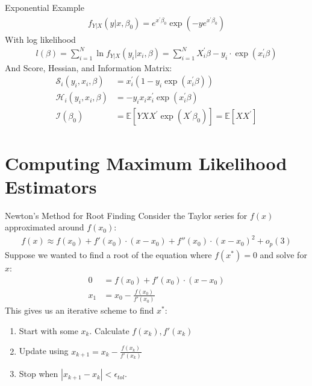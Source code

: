 \documentclass[aspectratio=169]{beamer}
\begin{document}
\begin{frame}{Exponential Example}
\begin{align*}
f _ { Y | X } ( y | x , \beta _ { 0 } ) =  { e } ^ { x ^ { \prime } \beta _ { 0 } } \exp \left( - y  { e } ^ { x ^ { \prime } \beta _ { 0 } } \right)
\end{align*}
With log likelihood
\begin{align*}
l( \beta ) = \sum _ { i = 1 } ^ { N } \ln f _ { Y | X } \left( y _ { i } | x _ { i } , \beta \right) = \sum _ { i = 1 } ^ { N } X _ { i } ^ { \prime } \beta - y _ { i } \cdot \exp \left( x _ { i } ^ { \prime } \beta \right)
\end{align*}
And Score, Hessian, and Information Matrix:
\begin{align*}
\mathcal { S }_i ( y_i, x_i , \beta ) &= x_i ^ { \prime } \left( 1 - y_i \exp \left( x_i ^ { \prime } \beta \right) \right)\\
\mathcal { H }_i ( y_i , x_i , \beta ) &= - y_i x_i x_i ^ { \prime } \exp \left( x_i ^ { \prime } \beta \right)\\
\mathcal { I } \left( \beta _ { 0 } \right) &= \mathbb { E } \left[ Y X X ^ { \prime } \exp \left( X ^ { \prime } \beta _ { 0 } \right) \right] = \mathbb { E } \left[ X X ^ { \prime } \right]
\end{align*}
\end{frame}


\section*{Computing Maximum Likelihood Estimators}

\begin{frame}{Newton's Method for Root Finding}
Consider the Taylor series for $f(x)$ approximated around $f(x_0)$:
\begin{align*}
f(x) \approx f(x_0) + f'(x_0) \cdot (x-x_0) + f''(x_0) \cdot (x-x_0)^2 + o_p(3)
\end{align*}
Suppose we wanted to find a \alert{root} of the equation where $f(x^{*})=0$ and solve for $x$:
\begin{align*}
0 &= f(x_0) + f'(x_0) \cdot (x-x_0) \\
x_1 &= x_0-\frac{f(x_0)}{f'(x_0)} 
\end{align*}
This gives us an \alert{iterative} scheme to find $x^{*}$:
\begin{enumerate}
\item Start with some $x_k$. Calculate $f(x_k),f'(x_k)$
\item Update using $x_{k+1} = x_k - \frac{f(x_k)}{f'(x_k)} $
\item Stop when $|x_{k+1}-x_{k}| < \epsilon_{tol}$.
\end{enumerate}
\end{frame}
\end{document}
